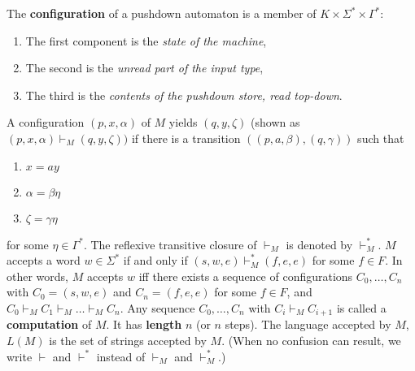 \newpage
\noindent The \textbf{configuration} of a pushdown automaton is a member of $K \times \Sigma^* \times \Gamma^*$:
\begin{enumerate}
  \item The first component is the \textit{state of the machine},
  \item The second is the \textit{unread part of the input type},
  \item The third is the \textit{contents of the pushdown store, read top-down}.\\
\end{enumerate}

\noindent A configuration $(p, x, \alpha)$ of $M$ yields $(q, y, \zeta)$ (shown as $(p, x, \alpha) \vdash_M (q, y, \zeta))$ if there is a transition $((p, a, \beta),(q, \gamma))$ such that
\begin{center}
  \begin{multicols}{3}
    \begin{enumerate}
      \item $x = ay$
      \item $\alpha = \beta \eta$
      \item $\zeta = \gamma \eta$
    \end{enumerate}
  \end{multicols}
\end{center}
\noindent for some $\eta \in \Gamma^*$. The reflexive transitive closure of $\vdash_M$ is denoted by $\vdash_M^*$. $M$ accepts a word $w \in \Sigma^*$ if and only if $(s, w, e) \vdash_M^* (f, e, e)$ for some $f \in F$. In other words, $M$ accepts $w$ iff there exists a sequence of configurations $C_0, \ldots, C_n$ with $C_0 = (s, w, e)$ and $C_n = (f, e, e)$ for some $f \in F$, and $C_0 \vdash_M C_1 \vdash_M \ldots \vdash_M C_n$. Any sequence $C_0, \ldots, C_n$ with $C_i \vdash_M C_{i+1}$ is called a \textbf{computation} of $M$. It has \textbf{length} $n$ (or $n$ steps). The language accepted by $M$, $L(M)$ is the set of strings accepted by $M$. (When no confusion can result, we write $\vdash$ and $\vdash^*$ instead of $\vdash_M$ and $\vdash_M^*$.)
